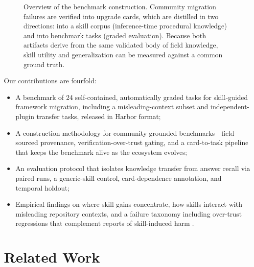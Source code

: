\documentclass[11pt]{article}
\begin{document}
\begin{figure}[t]
\centering
{}
\caption{Overview of the benchmark construction. Community migration failures are verified into upgrade cards, which are distilled in two directions: into a skill corpus (inference-time procedural knowledge) and into benchmark tasks (graded evaluation). Because both artifacts derive from the same validated body of field knowledge, skill utility and generalization can be measured against a common ground truth.}
\label{fig:teaser}
\end{figure}

Our contributions are fourfold:
\begin{itemize}
\item A benchmark of 24 self-contained, automatically graded tasks for skill-guided framework migration, including a misleading-context subset and independent-plugin transfer tasks, released in Harbor format;
\item A construction methodology for community-grounded benchmarks---field-sourced provenance, verification-over-trust gating, and a card-to-task pipeline that keeps the benchmark alive as the ecosystem evolves;
\item An evaluation protocol that isolates knowledge transfer from answer recall via paired runs, a generic-skill control, card-dependence annotation, and temporal holdout;
\item Empirical findings on where skill gains concentrate, how skills interact with misleading repository contexts, and a failure taxonomy including over-trust regressions that complement reports of skill-induced harm \citep{skillsharmful}.
\end{itemize}

\section{Related Work}
\end{document}
